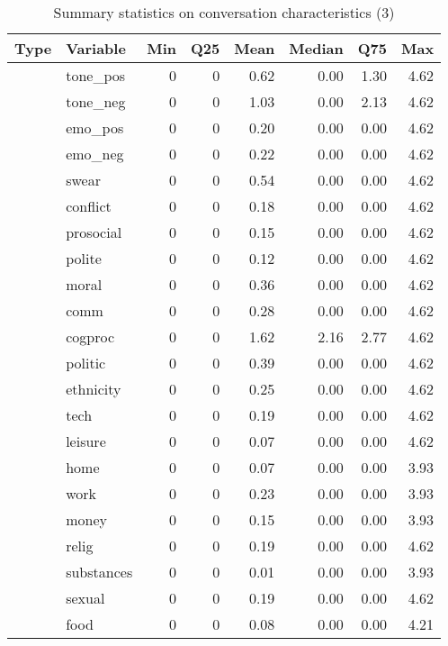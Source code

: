 \begin{table}[!h]
\centering
\caption{\label{tab:summ-tab-liwc}Summary statistics on conversation characteristics (3)}
\centering
\begin{tabular}[t]{llrrrrrr}
\toprule
Type & Variable & Min & Q25 & Mean & Median & Q75 & Max\\
\midrule
 & tone\_pos & 0 & 0 & 0.62 & 0.00 & 1.30 & 4.62\\
\cmidrule{2-8}
 & tone\_neg & 0 & 0 & 1.03 & 0.00 & 2.13 & 4.62\\
\cmidrule{2-8}
 & emo\_pos & 0 & 0 & 0.20 & 0.00 & 0.00 & 4.62\\
\cmidrule{2-8}
 & emo\_neg & 0 & 0 & 0.22 & 0.00 & 0.00 & 4.62\\
\cmidrule{2-8}
 & swear & 0 & 0 & 0.54 & 0.00 & 0.00 & 4.62\\
\cmidrule{2-8}
 & conflict & 0 & 0 & 0.18 & 0.00 & 0.00 & 4.62\\
\cmidrule{2-8}
 & prosocial & 0 & 0 & 0.15 & 0.00 & 0.00 & 4.62\\
\cmidrule{2-8}
 & polite & 0 & 0 & 0.12 & 0.00 & 0.00 & 4.62\\
\cmidrule{2-8}
 & moral & 0 & 0 & 0.36 & 0.00 & 0.00 & 4.62\\
\cmidrule{2-8}
 & comm & 0 & 0 & 0.28 & 0.00 & 0.00 & 4.62\\
\cmidrule{2-8}
 & cogproc & 0 & 0 & 1.62 & 2.16 & 2.77 & 4.62\\
\cmidrule{2-8}
 & politic & 0 & 0 & 0.39 & 0.00 & 0.00 & 4.62\\
\cmidrule{2-8}
 & ethnicity & 0 & 0 & 0.25 & 0.00 & 0.00 & 4.62\\
\cmidrule{2-8}
 & tech & 0 & 0 & 0.19 & 0.00 & 0.00 & 4.62\\
\cmidrule{2-8}
 & leisure & 0 & 0 & 0.07 & 0.00 & 0.00 & 4.62\\
\cmidrule{2-8}
 & home & 0 & 0 & 0.07 & 0.00 & 0.00 & 3.93\\
\cmidrule{2-8}
 & work & 0 & 0 & 0.23 & 0.00 & 0.00 & 3.93\\
\cmidrule{2-8}
 & money & 0 & 0 & 0.15 & 0.00 & 0.00 & 3.93\\
\cmidrule{2-8}
 & relig & 0 & 0 & 0.19 & 0.00 & 0.00 & 4.62\\
\cmidrule{2-8}
 & substances & 0 & 0 & 0.01 & 0.00 & 0.00 & 3.93\\
\cmidrule{2-8}
 & sexual & 0 & 0 & 0.19 & 0.00 & 0.00 & 4.62\\
\cmidrule{2-8}
 & food & 0 & 0 & 0.08 & 0.00 & 0.00 & 4.21\\

\end{tabular}
\end{table}
